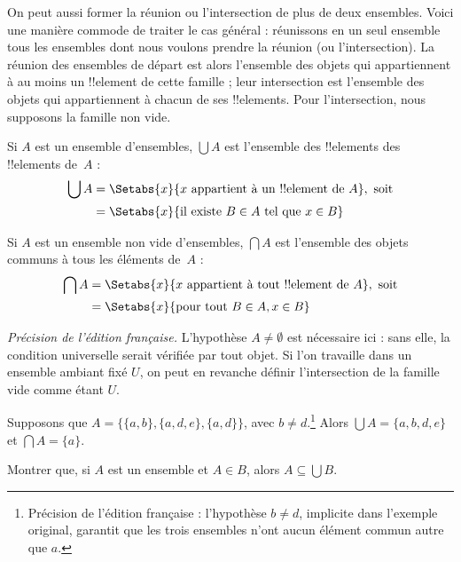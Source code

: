 \documentclass[11pt,a4paper,openany]{memoir}
\begin{document}
\begin{explain}
On peut aussi former la réunion ou l'intersection de plus de
deux ensembles. Voici une manière commode de traiter le cas général :
réunissons en un seul ensemble tous les ensembles dont nous voulons
prendre la réunion (ou l'intersection). La réunion des ensembles
de départ est alors l'ensemble des objets qui appartiennent à
au moins un !!{element} de cette famille ; leur intersection
est l'ensemble des objets qui appartiennent à chacun de ses
!!{element}s. Pour l'intersection, nous supposons la famille non vide.
\end{explain}

\begin{defn}
Si $A$ est un ensemble d'ensembles, $\bigcup A$ est l'ensemble
des !!{element}s des !!{element}s de~$A$ :
\begin{align*}
\bigcup A & = \Setabs{x}{x \text{ appartient à un !!{element} de } A},
\text{ soit}\\
& = \Setabs{x}{\text{il existe } B \in A
  \text{ tel que } x \in B}
\end{align*}
\end{defn}

\begin{defn}
Si $A$ est un ensemble non vide d'ensembles, $\bigcap A$ est
l'ensemble des objets communs à tous les éléments de~$A$ :
\begin{align*}
\bigcap A & = \Setabs{x}{x \text{ appartient à tout !!{element} de } A},
\text{ soit}\\
 & = \Setabs{x}{\text{pour tout } B \in A, x \in B}
\end{align*}
\end{defn}
\noindent\emph{Précision de l'édition française.}
L'hypothèse $A\neq\emptyset$ est nécessaire ici : sans elle, la
condition universelle serait vérifiée par tout objet. Si l'on travaille
dans un ensemble ambiant fixé $U$, on peut en revanche définir
l'intersection de la famille vide comme étant $U$.

\begin{ex}
Supposons que $A = \{ \{ a, b \}, \{ a, d, e \}, \{ a, d \} \}$,
avec $b\neq d$.\footnote{Précision de l'édition française :
l'hypothèse $b\neq d$, implicite dans l'exemple original,
garantit que les trois ensembles n'ont aucun élément commun autre que $a$.}
Alors $\bigcup A = \{ a, b, d, e \}$ et $\bigcap A = \{ a \}$.
\end{ex}
\begin{prob}
	Montrer que, si $A$ est un ensemble et $A \in B$,
	alors $A \subseteq \bigcup B$.
\end{prob}
\end{document}
